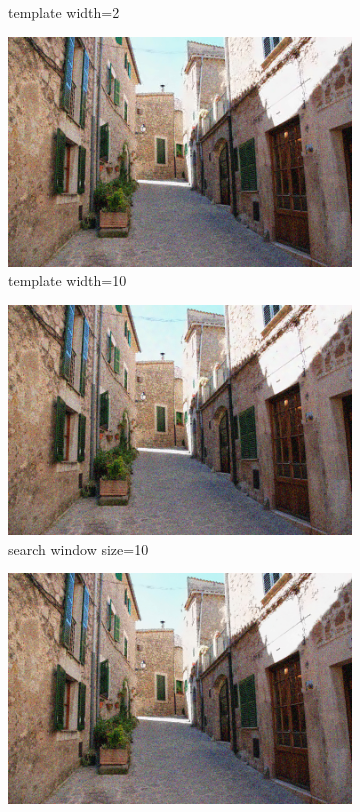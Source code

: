 \documentclass[11pt]{article}
\begin{document}
\begin{figure}[H]
\begin{subfigure}{.24\textwidth}
		\caption{template width=2}
		\label{fig:template2}
	\end{subfigure}
	\begin{subfigure}{.24\textwidth}
		\centering
		\includegraphics[width=\linewidth]{template15}
		\caption{template width=10}
		\label{fig:template15}
	\end{subfigure}
	\begin{subfigure}{.24\textwidth}
		\centering
		\includegraphics[width=\linewidth]{search10}
		\caption{search window size=10}
		\label{fig:search10}
	\end{subfigure}
	\begin{subfigure}{.24\textwidth}
		\centering
		\includegraphics[width=\linewidth]{search30}

\end{subfigure}
\end{figure}
\end{document}
